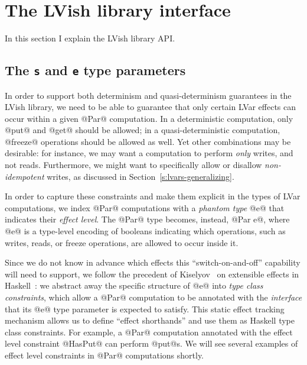 \section{The LVish library interface}\label{s:lvish-api}

In this section I explain the LVish library API.



\subsection{The \lstinline|s| and \lstinline|e| type parameters}

In order to support both determinism and quasi-determinism guarantees
in the LVish library, we need to be able to guarantee that only
certain LVar effects can occur within a given @Par@ computation.  In a
deterministic computation, only @put@ and @get@ should be allowed; in
a quasi-deterministic computation, @freeze@ operations should be
allowed as well.  Yet other combinations may be desirable: for
instance, we may want a computation to perform \emph{only} writes, and
not reads.  Furthermore, we might want to specifically allow or
disallow \emph{non-idempotent} writes, as discussed in
Section~\ref{s:lvars-generalizing}.

In order to capture these constraints and make them explicit in the
types of LVar computations, we index @Par@ computations with a
\emph{phantom type} @e@ that indicates their \emph{effect level}.  The
@Par@ type becomes, instead, @Par e@, where @e@ is a type-level
encoding of booleans indicating which operations, such as writes,
reads, or freeze operations, are allowed to occur inside it.

Since we do not know in advance which effects this
``switch-on-and-off'' capability will need to support, we follow the
precedent of Kiselyov \etal~on extensible effects in
Haskell~\cite{oleg-amr-haskell-2013}: we abstract away the specific
structure of @e@ into \emph{type class constraints}, which allow a
@Par@ computation to be annotated with the \emph{interface} that its
@e@ type parameter is expected to satisfy.  This static effect
tracking mechanism allows us to define ``effect shorthands'' and use
them as Haskell type class constraints.  For example, a @Par@
computation annotated with the effect level constraint @HasPut@ can
perform @put@s.  We will see several examples of effect level
constraints in @Par@ computations shortly.

